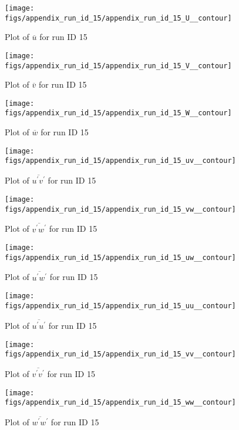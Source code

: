 \begin{figure}[H]
\centering
\texttt{[image: figs/appendix\_run\_id\_15/appendix\_run\_id\_15\_U\_\_contour]}
\caption{Plot of $\overline{u}$ for run ID 15}
\label{fig:appendix_run_id_15_U__contour}
\end{figure}


\begin{figure}[H]
\centering
\texttt{[image: figs/appendix\_run\_id\_15/appendix\_run\_id\_15\_V\_\_contour]}
\caption{Plot of $\overline{v}$ for run ID 15}
\label{fig:appendix_run_id_15_V__contour}
\end{figure}


\begin{figure}[H]
\centering
\texttt{[image: figs/appendix\_run\_id\_15/appendix\_run\_id\_15\_W\_\_contour]}
\caption{Plot of $\overline{w}$ for run ID 15}
\label{fig:appendix_run_id_15_W__contour}
\end{figure}


\begin{figure}[H]
\centering
\texttt{[image: figs/appendix\_run\_id\_15/appendix\_run\_id\_15\_uv\_\_contour]}
\caption{Plot of $\overline{u^\prime v^\prime}$ for run ID 15}
\label{fig:appendix_run_id_15_uv__contour}
\end{figure}


\begin{figure}[H]
\centering
\texttt{[image: figs/appendix\_run\_id\_15/appendix\_run\_id\_15\_vw\_\_contour]}
\caption{Plot of $\overline{v^\prime w^\prime}$ for run ID 15}
\label{fig:appendix_run_id_15_vw__contour}
\end{figure}


\begin{figure}[H]
\centering
\texttt{[image: figs/appendix\_run\_id\_15/appendix\_run\_id\_15\_uw\_\_contour]}
\caption{Plot of $\overline{u^\prime w^\prime}$ for run ID 15}
\label{fig:appendix_run_id_15_uw__contour}
\end{figure}


\begin{figure}[H]
\centering
\texttt{[image: figs/appendix\_run\_id\_15/appendix\_run\_id\_15\_uu\_\_contour]}
\caption{Plot of $\overline{u^\prime u^\prime}$ for run ID 15}
\label{fig:appendix_run_id_15_uu__contour}
\end{figure}


\begin{figure}[H]
\centering
\texttt{[image: figs/appendix\_run\_id\_15/appendix\_run\_id\_15\_vv\_\_contour]}
\caption{Plot of $\overline{v^\prime v^\prime}$ for run ID 15}
\label{fig:appendix_run_id_15_vv__contour}
\end{figure}


\begin{figure}[H]
\centering
\texttt{[image: figs/appendix\_run\_id\_15/appendix\_run\_id\_15\_ww\_\_contour]}
\caption{Plot of $\overline{w^\prime w^\prime}$ for run ID 15}
\label{fig:appendix_run_id_15_ww__contour}
\end{figure}


